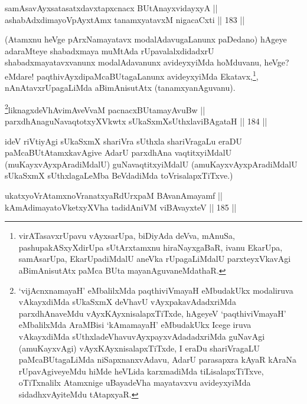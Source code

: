 
\begin{shl}
samAsavAyxsatasatxdavxtapxcnacx BUtAnayxvidayxyA || \\
ashabAdxdimayoV\s pAyxtAmx tanamxyatavxM nigacaCxti \hfill || 183 ||  
\end{shl}

\begin{artha}
(Atamxnu heVge pArxNamayatavx modalAdavugaLanunx paDedano) hAgeye
adaraMteye shabadxmaya muMtAda rUpavalalxdidadxrU
shabadxmayatavxvanunx modalAdavanunx avideyxyiMda hoMduvanu, heVge?
eMdare! paqthivAyxdipaMcaBUtagaLanunx avideyxyiMda
Ekatavx,\footnote{virATasavxrUpavu vAyxsarUpa, biDiyAda deVva,
mAnuSa, pashupakASxyXdirUpa sUtArxtamxnu hiraNayxgaBaR, ivanu
EkarUpa, samAsarUpa, EkarUpadiMdalU aneVka rUpagaLiMdalU
parxteyxVkavAgi aBimAnisutAtx paMca BUta mayanAguvaneMdathaR.}, nAnAtavx\footnotemark rUpagaLiMda aBimAnisutAtx
(tanamxyanAguvanu).
\end{artha}


\begin{shl}
\footnote{`vijAcnxnamayaH' eMbalilxMda paqthiviVmayaH eMbudakUkx modaliruva vAkayxdiMda sUkaSxmX deVhavU vAyxpakavAdadxriMda parxdhAnaveMdu vAyxKAyxnisalapxTiTxde, hAgeyeV `paqthiviVmayaH' eMbalilxMda AraMBisi `kAmamayaH' eMbudakUkx Icege iruva vAkayxdiMda sUthxladeVhavu\break vAyxpayxvAdadadxriMda guNavAgi (amuKayxvAgi) vAyxKAyxnisalapxTiTxde, I eraDu shariVragaLU paMcaBUtagaLiMda niSapxnanxvAdavu, AdarU parasapxra kAyaR kAraNa rUpavAgiveyeMdu hiMde heVLida karxmadiMda tiLisalapxTiTxve, oTiTxnalilx Atamxnige uBayadeVha mayatavxvu avideyxyiMda sidadhxvAyiteMdu tAtapxyaR.}liknagxdeVhAvimAveVvaM pacnacxBUtamayAvuBw || \\
parxdhAnaguNavaqtotxyXVkwtx sUkaSxmXsUthxlaviBAgataH \hfill || 184 ||  
\end{shl}

\begin{artha}
ideV riVtiyAgi sUkaSxmX shariVra sUthxla shariVragaLu eraDU
paMcaBUtAtamxkavAgive AdarU parxdhAna vaqtitxyiMdalU\break
(muKayxvAyxpAradiMdalU) guNavaqtitxyiMdalU (amuKayxvAyxpAradiMdalU
sUkaSxmX sUthxlagaLeMba BeVdadiMda toVrisalapxTiTxve.)
\end{artha}


\begin{shl}
ukatxyoVrAtamxnoVranatxyaRdUrxpaM BAvanAmayamf || \\
kAmAdimayatoVketxyXVha tadidAniVM viBAvayxteV \hfill || 185 ||  
\end{shl}

